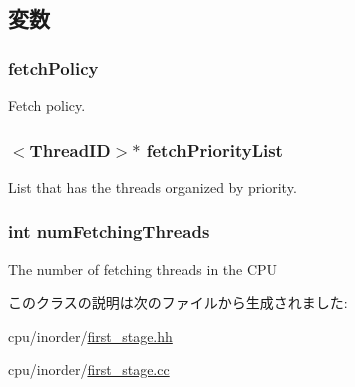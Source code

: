 \subsection{変数}
\hypertarget{classFirstStage_aad8c2ca9262308cfdb74cd69cda508f6}{
\subsubsection[{fetchPolicy}]{ {\bf fetchPolicy}}}
\label{classFirstStage_aad8c2ca9262308cfdb74cd69cda508f6}
Fetch policy. \hypertarget{classFirstStage_abdcd4a3705dfeada6582f853535e29f3}{
\subsubsection[{fetchPriorityList}]{$<${\bf ThreadID}$>$$\ast$ {\bf fetchPriorityList}}}
\label{classFirstStage_abdcd4a3705dfeada6582f853535e29f3}
List that has the threads organized by priority. \hypertarget{classFirstStage_abc07f427e4a6bddb47d14e781854189a}{
\subsubsection[{numFetchingThreads}]{\setlength{\rightskip}{0pt plus 5cm}int {\bf numFetchingThreads}}}
\label{classFirstStage_abc07f427e4a6bddb47d14e781854189a}
The number of fetching threads in the CPU 

このクラスの説明は次のファイルから生成されました:\begin{DoxyCompactItemize}
\item 
cpu/inorder/\hyperlink{first__stage_8hh}{first\_\-stage.hh}\item 
cpu/inorder/\hyperlink{first__stage_8cc}{first\_\-stage.cc}\end{DoxyCompactItemize}
